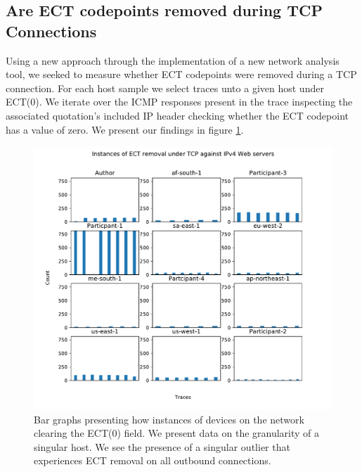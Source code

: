 \documentclass{l4proj}
\begin{document}
\subsection{Are ECT codepoints removed during TCP Connections}

Using a new approach through the implementation of a new network analysis tool, we seeked to measure whether ECT codepoints were removed during a TCP connection. For each host sample we select traces unto a given host under ECT(0). We iterate over the ICMP responses present in the trace inspecting the associated quotation's included IP header checking whether the ECT codepoint has a value of zero. We present our findings in figure \ref{fig:ect_strip}.

\begin{figure}[H]
    \centering
    \includegraphics[scale=0.7]{dissertation/images/tcp_bar.pdf}
    \caption{Bar graphs presenting how instances of devices on the network clearing the ECT(0) field. We present data on the granularity of a singular host. We see the presence of a singular outlier that experiences ECT removal on all outbound connections.}
    \label{fig:ect_strip}
\end{figure}
\end{document}
